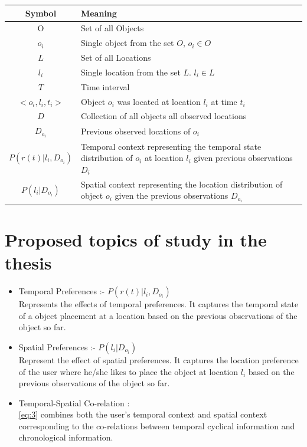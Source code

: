 \begin{tabular}{cp{8cm}}
    \hline
	Symbol & Meaning\\
	\hline
	O & Set of all Objects\\
	$o_i$ & Single object from the set $O$, $o_i \in O$ \\
	$L$ & Set of all Locations\\
	$l_i$ & Single location from the set $L$. $l_i\in L$\\
    $T$ & Time interval\\
    \hline
	$<o_i,l_i,t_i>$ & Object $o_i$ was located at location $l_i$ at time $t_i$\\
	$D$ & Collection of all objects all observed locations\\
	$D_{o_i}$ & Previous observed locations of $o_i$\\ 
    \hline
     $P(r(t) | l_i, D_{o_i})$ &  Temporal context representing the temporal state distribution of $o_i$ at location $l_i$ given previous observations $D_i$\\
     $P(l_i | D_{o_i})$ & Spatial context representing the location distribution of object $o_i$ given the previous observations $D_{o_i}$\\
    \hline
\end{tabular}

\section{Proposed topics of study in the thesis }
\label{sec:Proposed study}
\begin{itemize}
	\item Temporal Preferences :- $P(r(t) | l_i, D_{o_i})$ \\
	Represents the effects of temporal preferences. It captures the temporal state of a object placement at a location based on the previous observations of the object so far.
	\item Spatial Preferences :- $P(l_i | D_{o_i})$ \\
	Represent the effect of spatial preferences. It captures the location preference of the user where he/she likes to place the object at location $l_i$ based on the previous observations of the object so far.
	\item Temporal-Spatial Co-relation : \\
	\ref{eq:3} combines both the user's temporal context and spatial context corresponding to the co-relations between temporal cyclical information and chronological information.
\end{itemize}


